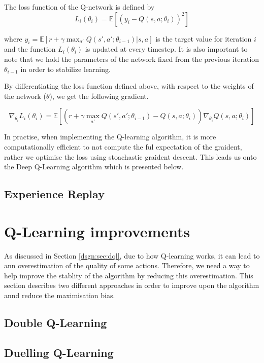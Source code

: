 \begin{defn}
	The loss function of the Q-network is defined by
	\[
		L_i(\theta_i) = \mathbb{E}\left[(y_i - Q(s, a; \theta_i))^2\right]
	\]
\end{defn}
where $y_i = \mathbb{E}\left[r + \gamma \max_{a'}Q(s', a'; \theta_{i - 1})\vert s, a\right]$ is the target value for iteration $i$ and the function $L_i(\theta_i)$ is updated at every timestep. It is also important to note that we hold the parameters of the network fixed from the previous iteration $\theta_{i - 1}$ in order to stabilize learning.

By differentiating the loss function defined above, with respect to the weights of the network ($\theta$), we get the following gradient.

\begin{defn}
	\[
		\nabla_{\theta_i} L_i(\theta_i) = \mathbb{E} \left[ \left( r + \gamma \max_{a'} Q(s', a'; \theta_{i - 1}) - Q(s, a; \theta_i)\right) \nabla_{\theta_i} Q(s, a; \theta_i) \right]
	\]
\end{defn}

In practise, when implementing the Q-learning algorithm, it is more computationally efficient to not compute the ful expectation of the graident, rather we optimise the loss using stoachastic graident descent. This leads us onto the Deep Q-Learning algorithm which is presented below.



\subsection{Experience Replay}
\label{dsgn:subsec:exp-replay}

\section{Q-Learning improvements}
\label{dsgn:sec:qlearning:qextra}
As discussed in Section \ref{dsgn:sec:dql}, due to how Q-learning works, it can lead to ann overestimation of the quality of some actions. Therefore, we need a way to help improve the stablity of the algorithm by reducing this overestimation. This section describes two different approaches in order to improve upon the algorithm annd reduce the maximisation bias.

\subsection{Double Q-Learning}
\label{dsgn:sec:qlearning:doubledqn}

\subsection{Duelling Q-Learning}
\label{dsgn:sec:qlearning:dueldqn}
